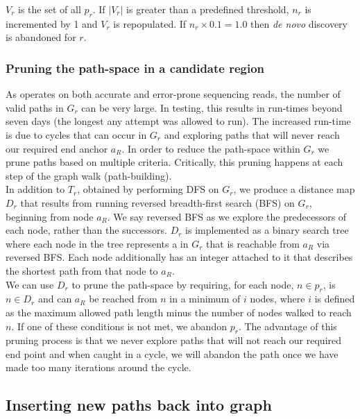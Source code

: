 $V_r$ is the set of all $p_r$. If $|V_r|$ is greater than a predefined threshold, $n_r$ is incremented by 1 and $V_r$ is repopulated. If $n_r \times 0.1 = 1.0$ then \textit{de novo} discovery is abandoned for $r$.

\subsubsection{Pruning the path-space in a candidate region}

As \pandora{} operates on both accurate and error-prone sequencing reads, the number of valid paths in $G_r$ can be very large. In testing, this results in run-times beyond seven days (the longest any attempt was allowed to run). The increased run-time is due to cycles that can occur in $G_r$ and exploring paths that will never reach our required end anchor $a_R$. In order to reduce the path-space within $G_r$ we prune paths based on multiple criteria. Critically, this pruning happens at each step of the graph walk (path-building).\\
In addition to $T_r$, obtained by performing DFS on $G_r$, we produce a distance map $D_r$ that results from running reversed breadth-first search (BFS) on $G_r$, beginning from node $a_R$. We say reversed BFS as we explore the predecessors of each node, rather than the successors. $D_r$ is implemented as a binary search tree where each node in the tree represents a \kmer{} in $G_r$ that is reachable from $a_R$ via reversed BFS. Each node additionally has an integer attached to it that describes the shortest path from that node to $a_R$.\\
We can use $D_r$ to prune the path-space by requiring, for each node, $n \in p_r$, is $n \in D_r$ and can $a_R$ be reached from $n$ in a minimum of $i$ nodes, where $i$ is defined as the maximum allowed path length minus the number of nodes walked to reach $n$. If one of these conditions is not met, we abandon $p_r$. The advantage of this pruning process is that we never explore paths that will not reach our required end point and when caught in a cycle, we will abandon the path once we have made too many iterations around the cycle.

\subsection{Inserting new paths back into graph}

